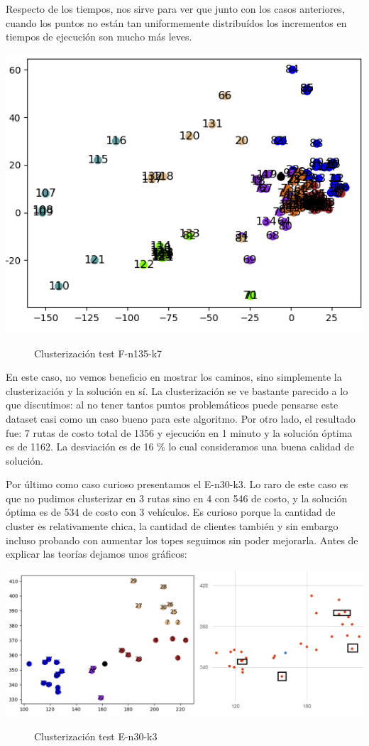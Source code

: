 \documentclass[11pt,a4paper]{article}
\begin{document}
Respecto de los tiempos, nos sirve para ver que junto con los casos anteriores, cuando los puntos no están tan uniformemente distribuídos los incrementos en tiempos de ejecución son mucho más leves.



\bigskip
\includegraphics[scale=.6]{graficos/F-n135-k7/cluster.png}
\\
\begin{figure}[!h]
\caption{Clusterización test F-n135-k7}
\end{figure}
En este caso, no vemos beneficio en mostrar los caminos, sino simplemente la clusterización y la solución en sí. La clusterización se ve bastante parecido a lo que discutimos: al no tener tantos puntos problemáticos puede pensarse este dataset casi como un caso bueno para este algoritmo. Por otro lado, el resultado fue: 7 rutas de costo total de 1356 y ejecución en 1 minuto y la solución óptima es de 1162. La desviación es de 16 \% lo cual consideramos una buena calidad de solución.

\bigskip
Por último como caso curioso presentamos el E-n30-k3. Lo raro de este caso es que no pudimos clusterizar en 3 rutas sino en 4 con 546 de costo, y la solución óptima es de 534 de costo con 3 vehículos. Es curioso porque la cantidad de cluster es relativamente chica, la cantidad de clientes también y sin embargo incluso probando con aumentar los topes seguimos sin poder 
mejorarla. Antes de explicar las teorías dejamos unos gráficos:

\bigskip
\includegraphics[scale=.6]{graficos/E-n30-k3/cluster.png}
\\
\begin{figure}[!h]
\caption{Clusterización test E-n30-k3}
\end{figure}
\end{document}
